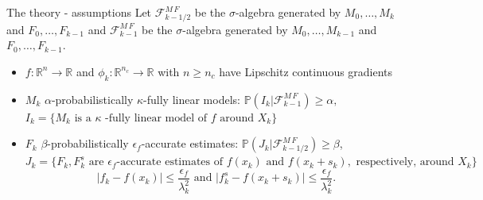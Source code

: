 \documentclass{beamer}
\newcommand{\coarse}{\phi}
\begin{document}

\begin{frame}{The theory - assumptions}
Let $\mathcal{F}^{M\, F}_{k-1/2}$ be
 the $\sigma$-algebra generated by $M_0,\dots,M_{k}$
and $F_0,\dots,F_{k-1}$ and  $\mathcal{F}^{M\, F}_{k-1}$ be
 the $\sigma$-algebra generated by $M_0,\dots,M_{k-1}$
and $F_0,\dots,F_{k-1}$.


\begin{itemize}
\item 
	 $f:\mathbb{R}^n\rightarrow\mathbb{R}$ and $\coarse_k:\mathbb{R}^{n_c}\rightarrow\mathbb{R}$ with $n\geq n_c$ have Lipschitz continuous gradients 

  \item $M_k$ \alert{$\alpha$-probabilistically $\kappa$-fully linear models}: $
\mathbb{P}(I_k|\mathcal{F}^{M\, F}_{k-1}) \geq \alpha,
$ $
I_k = \{M_k \text{ is a } \kappa\text{ -fully linear model of } f \text{ around } X_k\} 
$
\item $F_k$ \alert{$\beta$-probabilistically $\epsilon_f$-accurate estimates}: $\mathbb{P}(J_k|\mathcal{F}^{M\, F}_{k-1/2}) \geq \beta$, 
$
J_k = \{F_k,F_k^s \text{ are } \epsilon_f\text{-accurate estimates of } f(x_k) \text{ and } f(x_k+s_k), \text{ respectively, around } X_k\} 
$ $$
  \lvert f_k-f(x_k)\rvert\leq \frac{\epsilon_f}{\lambda_k^2} \text{ and } \lvert f_k^s-f(x_k+s_k)\rvert\leq \frac{\epsilon_f}{\lambda_k^2}.
  $$
  


\end{itemize}

		\end{frame}
\end{document}

